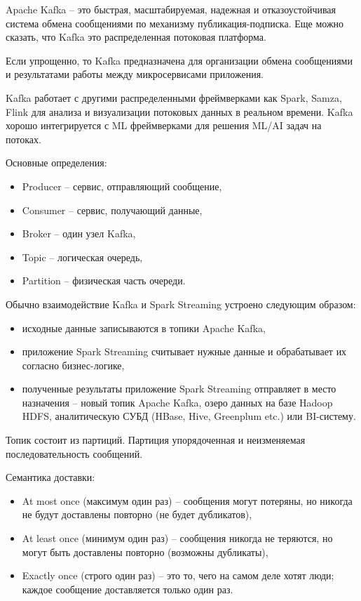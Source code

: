 \documentclass[%
	11pt,
	a4paper,
	utf8,
		]{article}
\begin{document}
Apache Kafka -- это быстрая, масштабируемая, надежная и отказоустойчивая система обмена сообщениями по механизму публикация-подписка. Еще можно сказать, что Kafka это распределенная потоковая платформа.

Если упрощенно, то Kafka предназначена для организации обмена сообщениями и результатами работы между микросервисами приложения.

Kafka работает с другими распределенными фреймверками как Spark, Samza, Flink для анализа и визуализации потоковых данных в реальном времени. Kafka хорошо интегрируется с ML фреймверками для решения ML/AI задач на потоках.

Основные определения:
\begin{itemize}
	\item Producer -- сервис, отправляющий сообщение,
	
	\item Consumer -- сервис, получающий данные,
	
	\item Broker -- один узел Kafka,
	
	\item Topic -- логическая очередь,
	
	\item Partition -- физическая часть очереди.
\end{itemize}

Обычно взаимодействие Kafka и Spark Streaming устроено следующим образом:
\begin{itemize}
	\item исходные данные записываются в топики Apache Kafka,
	
	\item приложение Spark Streaming считывает нужные данные и обрабатывает их согласно бизнес-логике,
	
	\item полученные результаты приложение Spark Streaming отправляет в место назначения -- новый топик Apache Kafka, озеро данных на базе Hadoop HDFS, аналитическую СУБД (HBase, Hive, Greenplum etc.) или BI-систему.
\end{itemize}

Топик состоит из партиций. Партиция упорядоченная и неизменяемая последовательность сообщений.

Семантика доставки:
\begin{itemize}
	\item At most once (максимум один раз) -- сообщения могут потеряны, но никогда не будут доставлены повторно (не будет дубликатов),
	
	\item At least once (минимум один раз) -- сообщения никогда не теряются, но могут быть доставлены повторно (возможны дубликаты),
	
	\item Exactly once (строго один раз) -- это то, чего на самом деле хотят люди; каждое сообщение доставляется только один раз.
\end{itemize}
\end{document}
